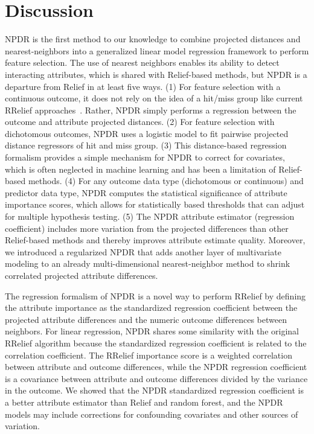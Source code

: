 \documentclass[10pt]{article}
\begin{document}
\section{Discussion}
NPDR is the first method to our knowledge to combine projected distances and nearest-neighbors into a generalized linear model regression framework to perform feature selection.
The use of nearest neighbors enables its ability to detect interacting attributes, which is shared with Relief-based methods, but NPDR is a departure from Relief in at least five ways.
(1) For feature selection with a continuous outcome, it does not rely on the idea of a hit/miss group like current RRelief approaches~\cite{urbanowicz17}.
Rather, NPDR simply performs a regression between the outcome and attribute projected distances.
(2) For feature selection with dichotomous outcomes, NPDR uses a logistic model to fit pairwise projected distance regressors of hit and miss group.
(3) This distance-based regression formalism provides a simple mechanism for NPDR to correct for covariates, which is often neglected in machine learning and has been a limitation of Relief-based methods.
(4) For any outcome data type (dichotomous or continuous) and predictor data type, NPDR computes the statistical significance of attribute importance scores, which allows for statistically based thresholds that can adjust for multiple hypothesis testing.
(5) The NPDR attribute estimator (regression coefficient) includes more variation from the projected differences than other Relief-based methods and thereby improves attribute estimate quality.
Moreover, we introduced a regularized NPDR that adds another layer of multivariate modeling to an already multi-dimensional nearest-neighbor method to shrink correlated projected attribute differences.  

The regression formalism of NPDR is a novel way to perform RRelief by defining the attribute importance as the standardized regression coefficient between the projected attribute differences and the numeric outcome differences between neighbors.
For linear regression, NPDR shares some similarity with the original RRelief algorithm because the standardized regression coefficient is related to the correlation coefficient.
The RRelief importance score is a weighted correlation between attribute and outcome differences, while the NPDR regression coefficient is a covariance between attribute and outcome differences divided by the variance in the outcome.
We showed that the NPDR standardized regression coefficient is a better attribute estimator than Relief and random forest, and the NPDR models may include corrections for confounding covariates and other sources of variation. 
\end{document}
